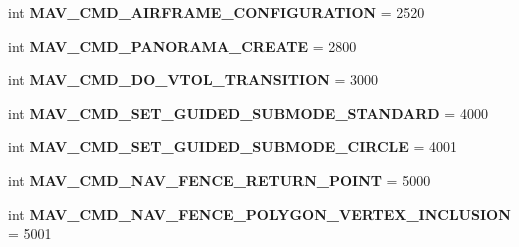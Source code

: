 \begin{DoxyCompactItemize}
\item 
\mbox{\label{namespacepymavlink_1_1dialects_1_1v10_ada0f06fcf7696ca3f4b5a475bbbb7203}} 
int {\bfseries M\+A\+V\+\_\+\+C\+M\+D\+\_\+\+A\+I\+R\+F\+R\+A\+M\+E\+\_\+\+C\+O\+N\+F\+I\+G\+U\+R\+A\+T\+I\+ON} = 2520
\item 
\mbox{\label{namespacepymavlink_1_1dialects_1_1v10_a059486050cda836e96f4d42a82f887d4}} 
int {\bfseries M\+A\+V\+\_\+\+C\+M\+D\+\_\+\+P\+A\+N\+O\+R\+A\+M\+A\+\_\+\+C\+R\+E\+A\+TE} = 2800
\item 
\mbox{\label{namespacepymavlink_1_1dialects_1_1v10_a0c8110341fd7974ddd1c95dc403724a8}} 
int {\bfseries M\+A\+V\+\_\+\+C\+M\+D\+\_\+\+D\+O\+\_\+\+V\+T\+O\+L\+\_\+\+T\+R\+A\+N\+S\+I\+T\+I\+ON} = 3000
\item 
\mbox{\label{namespacepymavlink_1_1dialects_1_1v10_a50dd0f398cc65d5bdba22d401e68e935}} 
int {\bfseries M\+A\+V\+\_\+\+C\+M\+D\+\_\+\+S\+E\+T\+\_\+\+G\+U\+I\+D\+E\+D\+\_\+\+S\+U\+B\+M\+O\+D\+E\+\_\+\+S\+T\+A\+N\+D\+A\+RD} = 4000
\item 
\mbox{\label{namespacepymavlink_1_1dialects_1_1v10_aaae094972668331b0d1f1c36df70e1ec}} 
int {\bfseries M\+A\+V\+\_\+\+C\+M\+D\+\_\+\+S\+E\+T\+\_\+\+G\+U\+I\+D\+E\+D\+\_\+\+S\+U\+B\+M\+O\+D\+E\+\_\+\+C\+I\+R\+C\+LE} = 4001
\item 
\mbox{\label{namespacepymavlink_1_1dialects_1_1v10_ac3a98e38cf73c8eafb795e2cf1e66e5f}} 
int {\bfseries M\+A\+V\+\_\+\+C\+M\+D\+\_\+\+N\+A\+V\+\_\+\+F\+E\+N\+C\+E\+\_\+\+R\+E\+T\+U\+R\+N\+\_\+\+P\+O\+I\+NT} = 5000
\item 
\mbox{\label{namespacepymavlink_1_1dialects_1_1v10_aae6f488b534eb7d7ec3848163c4d6cdb}} 
int {\bfseries M\+A\+V\+\_\+\+C\+M\+D\+\_\+\+N\+A\+V\+\_\+\+F\+E\+N\+C\+E\+\_\+\+P\+O\+L\+Y\+G\+O\+N\+\_\+\+V\+E\+R\+T\+E\+X\+\_\+\+I\+N\+C\+L\+U\+S\+I\+ON} = 5001
\item 
\mbox{\label{namespacepymavlink_1_1dialects_1_1v10_a88b689fbbfda7f1262ab6436d9d86a07}} 

\end{DoxyCompactItemize}
